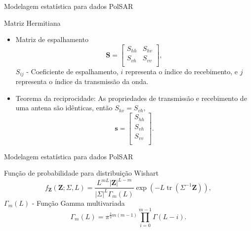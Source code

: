 \documentclass[10pt]{beamer}
\DeclareMathOperator{\traco}{tr} %
\begin{document}
\begin{frame}{Modelagem estatística para dados PolSAR}
	\begin{alertblock}{Matriz Hermitiana}
	\begin{itemize}
	\item Matriz de espalhamento
	\begin{equation}
\mathbf{S} = \left[
\begin{array}{cc}
	S_{hh}   & S_{hv}   \\
	S_{vh}   & S_{vv}   \\
\end{array}
\right],
\end{equation}
\alert{ $S_{ij}$ - Coeficiente de espalhamento, $i$ representa o índice do recebimento, e $j$ representa o índice da transmissão da onda.}
\item Teorema da reciprocidade: As propriedades de transmissão e recebimento de uma antena são idênticas, então $S_{hv}=S_{vh}$,
\begin{equation}
\mathbf{s} = \left[
\begin{array}{c}
	S_{hh}      \\
    S_{vh}     \\
	S_{vv}      \\
\end{array}
\right].
\end{equation}
\end{itemize}
\end{alertblock}
\end{frame}

\begin{frame}[fragile]{Modelagem estatística para dados PolSAR}
      
  \alert{Função de probabilidade para distribuição Wishart} 
%
\begin{equation}
    f_{\mathbf{Z}}(\mathbf{Z};\Sigma,L)=\frac{L^{mL}|\mathbf{Z}|^{L-m}}{|\Sigma|^{L}\Gamma_m(L)} \exp(-L\traco{(\Sigma^{-1}\mathbf{Z})}), 
\end{equation}
    \alert{$\Gamma_m(L)$ - Função Gamma multivariada}
\begin{equation}
	\Gamma_m(L)=\pi^{\frac{1}{2}m(m-1)} \prod_{i=0}^{m-1}\Gamma(L-i).
\end{equation}
\end{frame}
\end{document}
